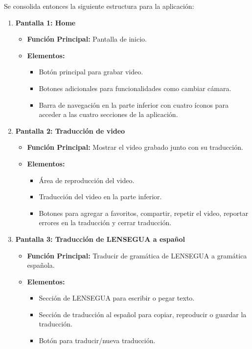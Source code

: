 Se consolida entonces la siguiente estructura para la aplicación:

\begin{enumerate}
    \item \textbf{Pantalla 1: Home}
    \begin{itemize}
        \item \textbf{Función Principal:} Pantalla de inicio.
        \item \textbf{Elementos:}
        \begin{itemize}
            \item Botón principal para grabar video.
            \item Botones adicionales para funcionalidades como cambiar cámara.
            \item Barra de navegación en la parte inferior con cuatro íconos para acceder a las cuatro secciones de la aplicación.
        \end{itemize}
    \end{itemize}

    \item \textbf{Pantalla 2: Traducción de video}
    \begin{itemize}
        \item \textbf{Función Principal:} Mostrar el video grabado junto con su traducción.
        \item \textbf{Elementos:}
        \begin{itemize}
            \item Área de reproducción del video.
            \item Traducción del video en la parte inferior.
            \item Botones para agregar a favoritos, compartir, repetir el video, reportar errores en la traducción y cerrar traducción.
        \end{itemize}
    \end{itemize}

    \item \textbf{Pantalla 3: Traducción de LENSEGUA a español}
    \begin{itemize}
        \item \textbf{Función Principal:} Traducir de gramática de LENSEGUA a gramática española.
        \item \textbf{Elementos:}
        \begin{itemize}
            \item Sección de LENSEGUA para escribir o pegar texto.
            \item Sección de traducción al español para copiar, reproducir o guardar la traducción.
            \item Botón para traducir/nueva traducción.
        \end{itemize}
    \end{itemize}


\end{enumerate}
